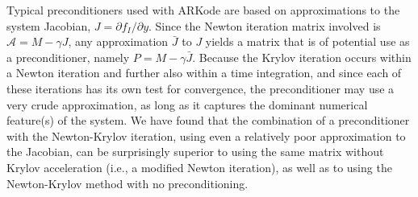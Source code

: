 \documentclass[letterpaper,10pt,english]{sphinxmanual}
\begin{document}
Typical preconditioners used with ARKode are based on approximations
to the system Jacobian, \(J = \partial f_I / \partial y\).  Since
the Newton iteration matrix involved is \({\mathcal A} = M - \gamma J\), any
approximation \(\bar{J}\) to \(J\) yields a matrix that is of
potential use as a preconditioner, namely \(P = M - \gamma
\bar{J}\). Because the Krylov iteration occurs within a Newton
iteration and further also within a time integration, and since each
of these iterations has its own test for convergence, the
preconditioner may use a very crude approximation, as long as it
captures the dominant numerical feature(s) of the system.  We have
found that the combination of a preconditioner with the Newton-Krylov
iteration, using even a relatively poor approximation to the Jacobian,
can be surprisingly superior to using the same matrix without Krylov
acceleration (i.e., a modified Newton iteration), as well as to using
the Newton-Krylov method with no preconditioning.
\end{document}
